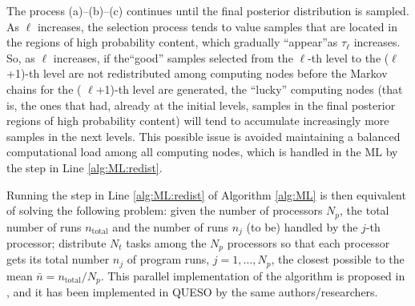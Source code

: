 The process (a)--(b)--(c) continues until the final posterior distribution is sampled.  As $\ell$ increases, the selection process tends to value samples that are located in the regions of high probability content, which gradually ``appear''as  $\tau_\ell$ increases. So, as $\ell$ increases, if the``good'' samples selected from the  $\ell$-th level to the ($\ell$+1)-th level are not redistributed among computing nodes before the Markov chains for the ( $\ell$+1)-th level are generated, the ``lucky'' computing nodes (that is, the ones that had, already at the initial levels, samples in the final posterior regions of high probability content) will tend to accumulate increasingly more samples in the next levels. This possible issue is avoided maintaining a balanced computational load among all computing
nodes, which is handled in the ML by the step in Line \ref{alg:ML:redist}. 

Running the step in Line \ref{alg:ML:redist} of Algorithm \ref{alg:ML} is then equivalent of solving the following problem: given the number of processors $N_p$, the total number of runs $n_\text{total}$ and the number of runs $n_j$ (to be) handled by the $j$-th processor; distribute $N_t$ tasks among the $N_p$ processors so that each processor gets its total number $n_j$ of program runs, $j = 1, \ldots, N_p$, the closest possible to the mean $\bar{n}=n_\text{total}/N_p$. This parallel implementation of the algorithm is proposed in \cite{CheungPrudencio2012}, and it has been implemented in QUESO by the same authors/researchers.

% 







